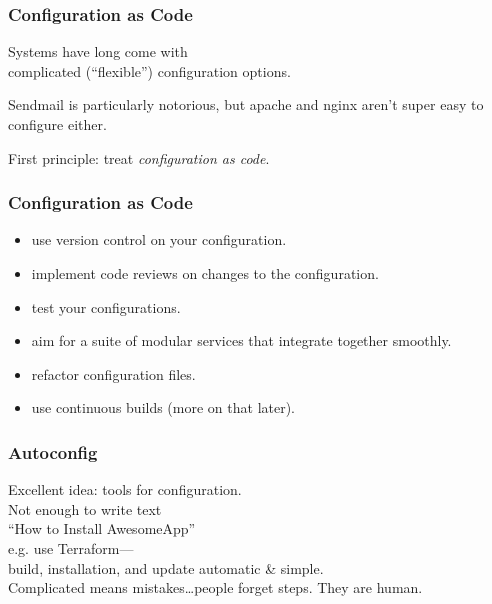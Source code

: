 \begin{frame}
\frametitle{Configuration as Code}

\large
\begin{changemargin}{2cm}
Systems have long come with \\
complicated (``flexible'') configuration options.


Sendmail is particularly notorious, but apache and nginx aren't super
easy to configure either.

First principle: treat \emph{configuration as code}.
\end{changemargin}

\end{frame}



\begin{frame}
\frametitle{Configuration as Code}

\large
\begin{changemargin}{2cm}
\begin{itemize}
\item use version control on your configuration.
\item implement code reviews on changes to the configuration.
\item test your configurations.
\item aim for a suite of modular services that integrate together smoothly.
\item refactor configuration files.
\item use continuous builds (more on that later).
\end{itemize}
\end{changemargin}

\end{frame}



\begin{frame}
\frametitle{Autoconfig}

\large
\begin{changemargin}{2cm}
Excellent idea: tools for configuration. \\[1em]

Not enough to write text \\
\qquad ``How to Install AwesomeApp'' \\[1em]

e.g. use Terraform---\\
build, installation, and update automatic \& simple.\\[1em]

 Complicated means mistakes\ldots people forget steps. They are human. 
 \end{changemargin}
 
\end{frame}



